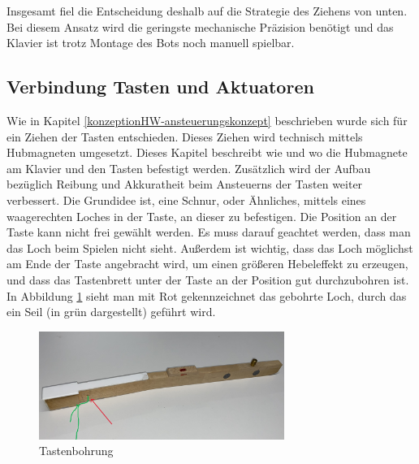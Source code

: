 Insgesamt fiel die Entscheidung deshalb auf die Strategie des Ziehens von unten.
Bei diesem Ansatz wird die geringste mechanische Präzision benötigt und das Klavier ist trotz Montage des Bots noch manuell spielbar.


\subsection{Verbindung Tasten und Aktuatoren} \label{subsec:VerbindungTastenAktuatoren}

Wie in Kapitel \ref{konzeptionHW-ansteuerungskonzept} beschrieben wurde sich für ein Ziehen der Tasten entschieden.
Dieses Ziehen wird technisch mittels Hubmagneten umgesetzt. \newline
Dieses Kapitel beschreibt wie und wo die Hubmagnete am Klavier und den Tasten befestigt werden. %
Zusätzlich wird der Aufbau bezüglich Reibung und Akkuratheit beim Ansteuerns der Tasten weiter verbessert. %
\newline
Die Grundidee ist, eine Schnur, oder Ähnliches, mittels eines waagerechten Loches in der Taste, an dieser zu befestigen. %
Die Position an der Taste kann nicht frei gewählt werden. Es muss darauf geachtet werden,
dass man das Loch beim Spielen nicht sieht. %
Außerdem ist wichtig, dass das Loch möglichst am Ende der Taste angebracht wird, um einen größeren Hebeleffekt zu erzeugen,
und dass das Tastenbrett unter der Taste an der Position gut durchzubohren ist.
In Abbildung \ref{img:Tastenbohrung} sieht man mit Rot gekennzeichnet das gebohrte Loch, durch das ein Seil (in grün dargestellt) geführt wird.

\begin{figure}[htbp]
	\centering
	\includegraphics[width=8cm]{img/Taste_schraeg.jpg}
	\caption{Tastenbohrung}
	\label{img:Tastenbohrung}
\end{figure}


